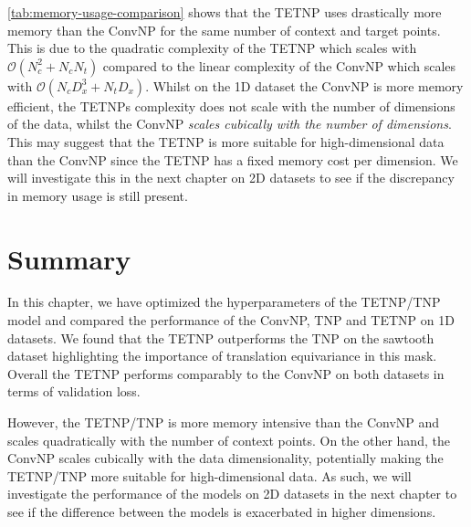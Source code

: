 \documentclass[../../main.tex]{subfiles}
\begin{document}
\autoref{tab:memory-usage-comparison} shows that the TETNP uses drastically more memory than the ConvNP for the same number of context and target points. This is due to the quadratic complexity of the TETNP which scales with $\mathcal{O}(N_c^2 + N_cN_t)$ compared to the linear complexity of the ConvNP which scales with $\mathcal{O}(N_cD_x^3 + N_tD_x)$. Whilst on the 1D dataset the ConvNP is more memory efficient, the TETNPs complexity does not scale with the number of dimensions of the data, whilst the ConvNP \emph{scales cubically with the number of dimensions}. This may suggest that the TETNP is more suitable for high-dimensional data than the ConvNP since the TETNP has a fixed memory cost per dimension. We will investigate this in the next chapter on 2D datasets to see if the discrepancy in memory usage is still present.

\section{Summary}

In this chapter, we have optimized the hyperparameters of the TETNP/TNP model and compared the performance of the ConvNP, TNP and TETNP on 1D datasets. We found that the TETNP outperforms the TNP on the sawtooth dataset highlighting the importance of translation equivariance in this mask. Overall the TETNP performs comparably to the ConvNP on both datasets in terms of validation loss.

However, the TETNP/TNP is more memory intensive than the ConvNP and scales quadratically with the number of context points. On the other hand, the ConvNP scales cubically with the data dimensionality, potentially making the TETNP/TNP more suitable for high-dimensional data. As such, we will investigate the performance of the models on 2D datasets in the next chapter to see if the difference between the models is exacerbated in higher dimensions.


\ifSubfilesClassLoaded{%
    \printbibliography{}
}{} 
\end{document}

